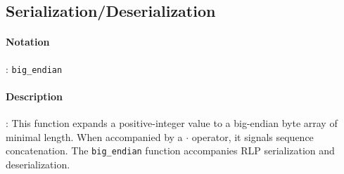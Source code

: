 \documentclass[10pt,a4paper,leqno,bibliography=totoc]{scrartcl}
\newenvironment{alphafootnotes}
{\par\edef\savedfootnotenumber{\number\value{footnote}}
\renewcommand{\thefootnote}{\alph{footnote}}
\setcounter{footnote}{0}}
{\par\setcounter{footnote}{\savedfootnotenumber}}
\begin{document}
\begin{alphafootnotes}
\begin{multicols*}{2}
		\subsection{Serialization/Deserialization}
			\paragraph{Notation}: \texttt{big\_endian}
			\paragraph{Description}: This function expands a positive-integer value to a big-endian byte  array of minimal length.  When accompanied by a $\cdot$ operator, it signals sequence concatenation.  The \texttt{big\_endian} function  accompanies RLP serialization and deserialization.
		

\end{multicols*}
\end{alphafootnotes}
\end{document}
